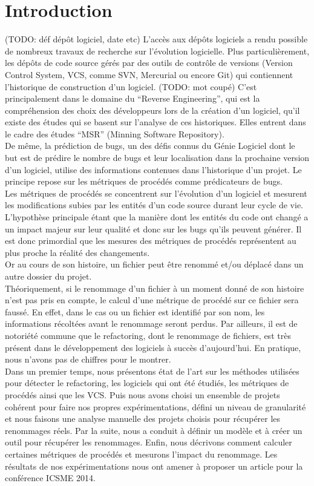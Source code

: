 \section{Introduction}
\label{sec:intro}

(TODO: déf dépôt logiciel, date etc) L'accès aux dépôts logiciels a rendu possible de nombreux travaux de recherche sur l'évolution logicielle. Plus particulièrement, les dépôts de code source gérés par des outils de contrôle de versions (Version Control System, VCS, comme SVN, Mercurial ou encore Git) qui contiennent l'historique de construction d'un logiciel. (TODO: mot coupé) C'est principalement dans le domaine du ``Reverse Engineering'', qui est la compréhension des choix des développeurs lors de la création d'un logiciel, qu'il existe des études qui se basent sur l'analyse de ces historiques. Elles entrent dans le cadre des études ``MSR'' (Minning Software Repository).\\
De même, la prédiction de bugs, un des défis connus du Génie Logiciel dont le but est de prédire le nombre de bugs et leur localisation dans la prochaine version d'un logiciel, utilise des informations contenues dans l'historique d'un projet. Le principe repose sur les métriques de procédés comme prédicateurs de bugs.\\
Les métriques de procédés se concentrent sur l'évolution d'un logiciel et mesurent les modifications subies par les entités d'un code source durant leur cycle de vie. L'hypothèse principale étant que la manière dont les entités du code ont changé a un impact majeur sur leur qualité et donc sur les bugs qu'ils peuvent générer. Il est donc primordial que les mesures des métriques de procédés représentent au plus proche la réalité des changements.\\
Or au cours de son histoire, un fichier peut être renommé et/ou déplacé dans un autre dossier du projet.\\
Théoriquement, si le renommage d'un fichier à un moment donné de son histoire n'est pas pris en compte, le calcul d'une métrique de procédé sur ce fichier sera faussé. En effet, dans le cas ou un fichier est identifié par son nom, les informations récoltées avant le renommage seront perdus. Par ailleurs, il est de notoriété commune que le refactoring, dont le renommage de fichiers, est très présent dans le développement des logiciels à succès d'aujourd'hui. En pratique, nous n'avons pas de chiffres pour le montrer.\\ 
Dans un premier temps, nous présentons état de l'art sur les méthodes utilisées pour détecter le refactoring, les logiciels qui ont été étudiés, les métriques de procédés ainsi que les VCS. Puis nous avons choisi un ensemble de projets cohérent pour faire nos propres expérimentations, défini un niveau de granularité et nous faisons une analyse manuelle des projets choisis pour récupérer les renommages réels. Par la suite, nous a conduit à définir un modèle et à créer un outil pour récupérer les renommages. Enfin, nous décrivons comment calculer certaines métriques de procédés et mesurons l'impact du renommage. Les résultats de nos expérimentations nous ont amener à proposer un article pour la conférence ICSME 2014.\\

